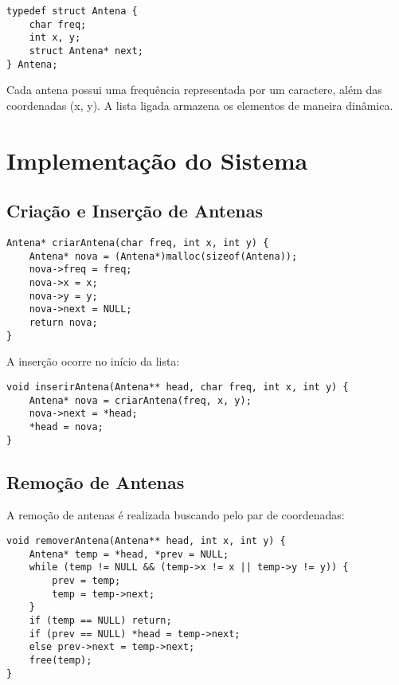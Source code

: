 \documentclass[12pt]{article}
\begin{document}
\begin{lstlisting}[caption=Estrutura da Antena]
typedef struct Antena {
    char freq;
    int x, y;
    struct Antena* next;
} Antena;
\end{lstlisting}

Cada antena possui uma frequência representada por um caractere, além das coordenadas (x, y). A lista ligada armazena os elementos de maneira dinâmica.

\section{Implementação do Sistema}

\subsection{Criação e Inserção de Antenas}

\begin{lstlisting}[caption=Função para criar uma antena]
Antena* criarAntena(char freq, int x, int y) {
    Antena* nova = (Antena*)malloc(sizeof(Antena));
    nova->freq = freq;
    nova->x = x;
    nova->y = y;
    nova->next = NULL;
    return nova;
}
\end{lstlisting}

A inserção ocorre no início da lista:

\begin{lstlisting}[caption=Função para inserir antenas]
void inserirAntena(Antena** head, char freq, int x, int y) {
    Antena* nova = criarAntena(freq, x, y);
    nova->next = *head;
    *head = nova;
}
\end{lstlisting}

\subsection{Remoção de Antenas}

A remoção de antenas é realizada buscando pelo par de coordenadas:

\begin{lstlisting}[caption=Função para remover uma antena]
void removerAntena(Antena** head, int x, int y) {
    Antena* temp = *head, *prev = NULL;
    while (temp != NULL && (temp->x != x || temp->y != y)) {
        prev = temp;
        temp = temp->next;
    }
    if (temp == NULL) return;
    if (prev == NULL) *head = temp->next;
    else prev->next = temp->next;
    free(temp);
}
\end{lstlisting}
\end{document}
